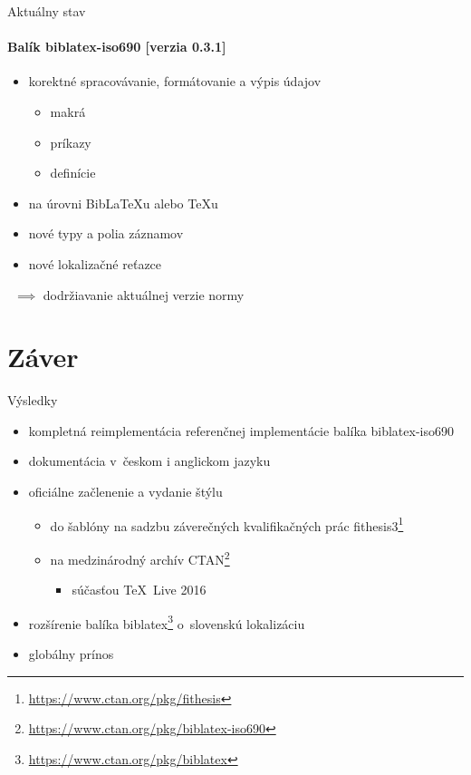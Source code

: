 \documentclass{beamer}
\begin{document}
\begin{frame}{Aktuálny stav}
\framesubtitle{Balík \textsf{biblatex-iso690} [verzia 0.3.1]}
\begin{itemize}
\item korektné spracovávanie, formátovanie a výpis údajov
  \begin{itemize}
  \item makrá
  \item príkazy
  \item definície
  \end{itemize}
\item na úrovni BibLaTeXu alebo \TeX u
\item nové typy a polia záznamov
\item nové lokalizačné reťazce
\end{itemize}
\ $\implies$ dodržiavanie aktuálnej verzie normy
\end{frame}



\section{Záver}

\begin{frame}{Výsledky}
\begin{itemize}
\item kompletná reimplementácia referenčnej implementácie balíka \textsf{biblatex-iso690}
\item dokumentácia v~českom i anglickom jazyku
\item oficiálne začlenenie a vydanie štýlu
  \begin{itemize}
  \item do šablóny na sadzbu záverečných kvalifikačných prác \textsf{fithesis3}\footnote[frame]{\url{https://www.ctan.org/pkg/fithesis}}
  \item na medzinárodný archív CTAN\footnote[frame]{\url{https://www.ctan.org/pkg/biblatex-iso690}}
    \begin{itemize}
    \item súčasťou \TeX\ Live 2016
    \end{itemize}
  \end{itemize}
\item rozšírenie balíka \textsf{biblatex}\footnote[frame]{\url{https://www.ctan.org/pkg/biblatex}} o~slovenskú lokalizáciu
\item globálny prínos
\end{itemize}
\end{frame}
\end{document}

